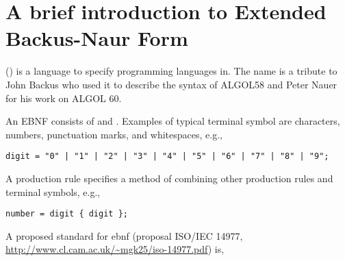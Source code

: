 \chapter{A brief introduction to Extended Backus-Naur Form}
\label{sec:ebnf}
 () is a language to specify programming languages in. The name is a tribute to John Backus who used it to describe the syntax of ALGOL58 and Peter Nauer for his work on ALGOL 60.

An EBNF consists of  and . Examples of typical terminal symbol are characters, numbers, punctuation marks, and whitespaces, e.g.,
\begin{lstlisting}[language=ebnf]
digit = "0" | "1" | "2" | "3" | "4" | "5" | "6" | "7" | "8" | "9";
\end{lstlisting}
A production rule specifies a method of combining other production rules and terminal symbols, e.g.,
\begin{lstlisting}[language=ebnf]
number = digit { digit };
\end{lstlisting}
A proposed standard for ebnf (proposal ISO/IEC 14977, \url{http://www.cl.cam.ac.uk/~mgk25/iso-14977.pdf}) is,
